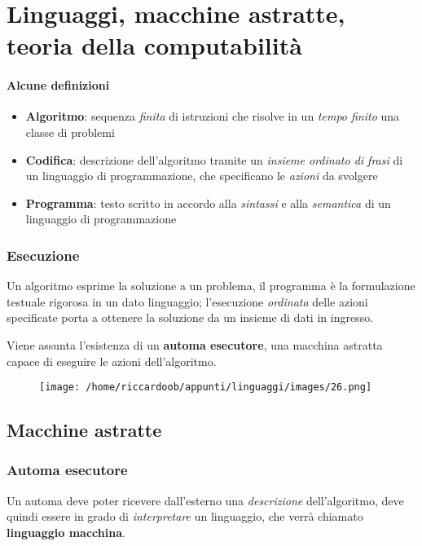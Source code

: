 \chapter{Linguaggi, macchine astratte, teoria della computabilità}

\subsubsection{Alcune definizioni}
\begin{itemize}
    \item \textbf{Algoritmo}: sequenza \textit{finita} di istruzioni che risolve in un \textit{tempo finito} una classe di problemi
    \item \textbf{Codifica}: descrizione dell'algoritmo tramite un \textit{insieme ordinato di frasi} di un linguaggio di programmazione, che specificano le \textit{azioni} da svolgere
    \item \textbf{Programma}: testo scritto in accordo alla \textit{sintassi} e alla \textit{semantica} di un linguaggio di programmazione
\end{itemize}

\subsection{Esecuzione}
Un algoritmo esprime la soluzione a un problema, il programma è la formulazione testuale rigorosa in un dato linguaggio; l'esecuzione \textit{ordinata} delle azioni specificate porta a ottenere la soluzione da un insieme di dati in ingresso.

Viene assunta l'esistenza di un \textbf{automa esecutore}, una macchina astratta capace di eseguire le azioni dell'algoritmo.

\begin{figure}[H]
    \centering
    \texttt{[image: /home/riccardoob/appunti/linguaggi/images/26.png]}
\end{figure}

\section{Macchine astratte}

\subsection{Automa esecutore}
Un automa deve poter ricevere dall'esterno una \textit{descrizione} dell'algoritmo, deve quindi essere in grado di \textit{interpretare} un linguaggio, che verrà chiamato \textbf{linguaggio macchina}.

